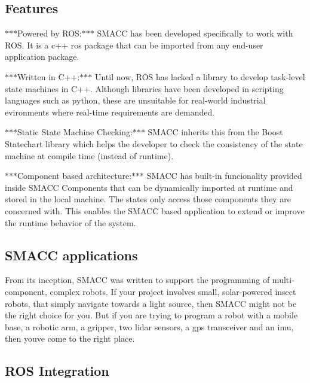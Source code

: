\subsection*{Features}


\begin{DoxyItemize}
\item $\ast$$\ast$$\ast$\+Powered by R\+OS\+:$\ast$$\ast$$\ast$ S\+M\+A\+CC has been developed specifically to work with R\+OS. It is a c++ ros package that can be imported from any end-\/user application package.
\item $\ast$$\ast$$\ast$\+Written in C++\+:$\ast$$\ast$$\ast$ Until now, R\+OS has lacked a library to develop task-\/level state machines in C++. Although libraries have been developed in scripting languages such as python, these are unsuitable for real-\/world industrial evironments where real-\/time requirements are demanded.
\item $\ast$$\ast$$\ast$\+Static State Machine Checking\+:$\ast$$\ast$$\ast$ S\+M\+A\+CC inherits this from the Boost Statechart library which helps the developer to check the consistency of the state machine at compile time (instead of runtime).
\item $\ast$$\ast$$\ast$\+Component based architecture\+:$\ast$$\ast$$\ast$ S\+M\+A\+CC has built-\/in funcionality provided inside S\+M\+A\+CC Components that can be dynamically imported at runtime and stored in the local machine. The states only access those components they are concerned with. This enables the S\+M\+A\+CC based application to extend or improve the runtime behavior of the system.
\end{DoxyItemize}

\subsection*{S\+M\+A\+CC applications}

From it\textquotesingle{}s inception, S\+M\+A\+CC was written to support the programming of multi-\/component, complex robots. If your project involves small, solar-\/powered insect robots, that simply navigate towards a light source, then S\+M\+A\+CC might not be the right choice for you. But if you are trying to program a robot with a mobile base, a robotic arm, a gripper, two lidar sensors, a gps transceiver and an imu, then you\textquotesingle{}ve come to the right place.

 

\subsection*{R\+OS Integration}



